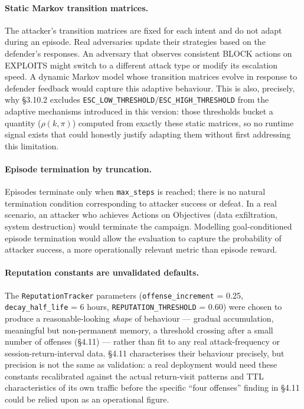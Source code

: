 \paragraph{Static Markov transition matrices.}
The attacker's transition matrices are fixed for each intent and do not
adapt during an episode.
Real adversaries update their strategies based on the defender's responses.
An adversary that observes consistent BLOCK actions on EXPLOITS might switch
to a different attack type or modify its escalation speed.
A dynamic Markov model whose transition matrices evolve in response to
defender feedback would capture this adaptive behaviour.
This is also, precisely, why \S3.10.2 excludes
\texttt{ESC\_LOW\_THRESHOLD}/\texttt{ESC\_HIGH\_THRESHOLD} from the adaptive
mechanisms introduced in this version: those thresholds bucket a quantity
($\rho(k, \pi)$) computed from exactly these static matrices, so no runtime
signal exists that could honestly justify adapting them without first
addressing this limitation.

\paragraph{Episode termination by truncation.}
Episodes terminate only when \texttt{max\_steps} is reached; there is no
natural termination condition corresponding to attacker success or defeat.
In a real scenario, an attacker who achieves Actions on Objectives (data
exfiltration, system destruction) would terminate the campaign.
Modelling goal-conditioned episode termination would allow the evaluation
to capture the probability of attacker success, a more operationally
relevant metric than episode reward.

\paragraph{Reputation constants are unvalidated defaults.}
The \texttt{ReputationTracker} parameters (\texttt{offense\_increment} =
0.25, \texttt{decay\_half\_life} = 6 hours, \texttt{REPUTATION\_THRESHOLD} =
0.60) were chosen to produce a reasonable-looking \emph{shape} of behaviour
--- gradual accumulation, meaningful but non-permanent memory, a threshold
crossing after a small number of offenses (\S4.11) --- rather than fit to
any real attack-frequency or session-return-interval data.
\S4.11 characterises their behaviour precisely, but precision is not the
same as validation: a real deployment would need these constants
recalibrated against the actual return-visit patterns and TTL
characteristics of its own traffic before the specific ``four offenses''
finding in \S4.11 could be relied upon as an operational figure.

